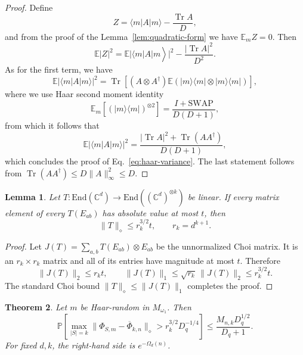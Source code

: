 \documentclass[10pt,twocolumn,superscriptaddress,aps,amsmath,amssymb,citeautoscript,floatfix,prx]{revtex4-2}
\theoremstyle{plain}
\theoremstyle{plain}
\theoremstyle{plain}
\theoremstyle{plain}
\theoremstyle{plain}
\theoremstyle{plain}
\newcommand{\C}{\mathbb{C}}
\newcommand{\End}{\mathrm{End}}
\theoremstyle{plain}
\newtheorem{smtheorem}{Theorem}[section]
\newtheorem{smlemma}[smtheorem]{Lemma}
\theoremstyle{definition}
\theoremstyle{plain}
\begin{document}
\begin{appendix}
\begin{proof}
Define 
\[
Z=\langle m| A|m\rangle-\frac{\operatorname{Tr} A}{D},
\]
and from the proof of the Lemma~\ref{lem:quadratic-form} we have $\mathbb{E}_m Z=0$. Then
\[
\left.\mathbb{E}|Z|^2=\mathbb{E}|\langle m| A| m\right\rangle\left.\right|^ 2-\frac{|\operatorname{Tr} A|^2}{D^2}.
\]
As for the first term, we have
\[
\mathbb{E}|\langle m| A| m\rangle\left.\right|^ 2=\operatorname{Tr}\left[\left(A \otimes A^{\dagger}\right)\mathbb{E}\left(|m\rangle\langle m| \otimes |m\rangle\langle m|\right)\right],
\]
where we use Haar second moment identity
\[
\mathbb{E}_m\left[(|m\rangle\langle m|)^{\otimes 2}\right]=\frac{I+\mathrm{SWAP}}{D(D+1)},
\]
from which it follows that
\[
   \mathbb{E}|\langle m| A| m\rangle\left.\right|^ 2= \frac{|\operatorname{Tr} A|^2+\operatorname{Tr}\left(A A^{\dagger}\right)}{D(D+1)},
\]
which concludes the proof of Eq.~\eqref{eq:haar-variance}. The last statement follows from $\operatorname{Tr}\left(A A^{\dagger}\right) \leq D\|A\|_{\infty}^{2} \leq D$.
\end{proof}

\begin{smlemma}
\label{lem:entry-to-diamond}
Let $T:\End(\C^d)\to\End((\C^d)^{\otimes k})$ be linear.  If every matrix element of every $T(E_{ab})$ has absolute value at most $t$, then
\begin{equation}
\label{eq:entry-diamond}
  \|T\|_\diamond\le r_k^{3/2}t,
  \qquad r_k=d^{k+1}.
\end{equation}
\end{smlemma}

\begin{proof}
Let $J(T)=\sum_{a,b}T(E_{ab})\otimes E_{ab}$ be the unnormalized Choi matrix.  It is an $r_k\times r_k$ matrix and all of its entries have magnitude at most $t$.  Therefore
\[
  \|J(T)\|_2\le r_k t,
  \qquad
  \|J(T)\|_1\le\sqrt{r_k}\,\|J(T)\|_2\le r_k^{3/2}t.
\]
The standard Choi bound $\|T\|_\diamond\le\|J(T)\|_1$ completes the proof.
\end{proof}

\begin{smtheorem}
\label{thm:haar-uniform}
Let $m$ be Haar-random in $M_{\omega_1}$.  Then
\begin{equation}
\label{eq:haar-probability}
  \mathbb P\!\left[
    \max_{|S|=k}
    \|\Phi_{S,m}-\overline\Phi_{k,n}\|_\diamond
    >r_k^{3/2}D_q^{-1/4}
  \right]
  \le
  \frac{M_{n,k}D_q^{1/2}}{D_q+1}.
\end{equation}
For fixed $d,k$, the right-hand side is $e^{-\Omega_d(n)}$.
\end{smtheorem}


\end{appendix}
\end{document}
